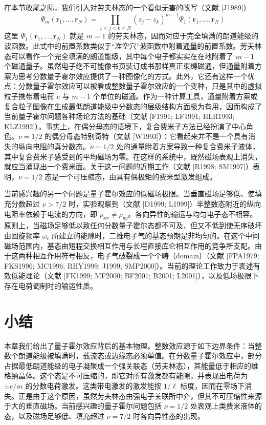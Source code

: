 在本节收尾之际，我们引入对劳夫林态的一个看似无害的改写（文献 [J1989]）
\begin{equation*}
\Psi_{m}(\mathbf{r}_{1},\ldots,\mathbf{r}_{N})=\prod_{1\le j<k\le N}(z_{j}-z_{k})^{m-1}\Psi_{1}(\mathbf{r}_{1},\ldots,\mathbf{r}_{N})\tag{15.95}
\end{equation*}
这里 $\Psi_{1}(\mathbf{r}_{1},\ldots,\mathbf{r}_{N})$ 就是 $m=1$ 的劳夫林态，因而对应于完全填满的朗道能级的波函数。此式中的前置系数类似于“准空穴”波函数中附着通量的前置系数。劳夫林态可以看作一个完全填满的朗道能级，其中每个电子都实实在在地附着了 $m-1$ 个磁通量子。虽然电子绝不可能像书页装订成书那样真正束缚磁通，但通量附着方案为思考分数量子霍尔效应提供了一种图像化的方式。此外，它还有这样一个优点：分数量子霍尔效应可以被看成整数量子霍尔效应的一个变种，只是其中的虚拟粒子携带着电荷 $e$ 与 $m-1$ 个单位的磁通。作为一种计算工具，通量附着方案或复合粒子图像在生成最低朗道能级中分数态的层级结构方面极为有用，因而构成了当前量子霍尔问题各种场论方法的基础（文献 [F1991; LF1991; HLR1993; KLZ1992]）。事实上，在偶分母态的语境下，复合费米子方法已经扮演了中心角色。$\nu=1/2$ 的偶分母态特别奇特（文献 [W1993]）：它看起来并不是一个具有消失的纵向电阻的真分数态。$\nu=1/2$ 处的通量附着方案导致一种复合费米子液体，其中复合费米子感受到的平均磁场为零。在这样的系统中，既然磁场表观上消失，就应当涌现出一个费米面。关于这一问题的近期工作（文献 [R1998; SM1997]）表明，$\nu=1/2$ 态是一个可压缩态，由具有偶极矩的费米型激发组成。

当前感兴趣的另一个问题是量子霍尔效应的低磁场极限。当垂直磁场足够低、使填充分数超过 $\nu>7/2$ 时，实验观察到（文献 [D1999; L1999]）半整数态附近的纵向电阻率依赖于电流的方向，即 $\rho_{xx}\neq\rho_{yy}$。各向异性的输运与均匀电子态不相容。原则上，当磁场足够低以致任何分数量子霍尔态都不可及、但又不低到使无序破坏由回旋频率 $\omega_{\mathrm{c}}$ 所建立的能隙时，二维电子气的基态预期是非均匀的。在这个中间磁场范围内，基态由短程交换相互作用与长程直接库仑相互作用的竞争所支配。由于这两种相互作用符号相反，电子气破裂成一个个畴（domain）（文献 [FPA1979; FKS1996; MC1996; RHY1999; J1999; SMP2000]）。当前的理论工作致力于表述有效低能理论（文献 [FK1999; MF2000; BF2001; B2001; L2001]），以及低场极限下存在电荷调制时的输运性质。

\section*{小结}

本章我们给出了量子霍尔效应背后的基本物理。整数效应源于如下边界条件：当整数个朗道能级被填满时，载流态或边缘态必须单值。在分数量子霍尔效应中，部分占据最低朗道能级的电子凝聚成一个强关联态（劳夫林态），其能量低于相应的维格纳晶体。这个态是不可压缩的，即它对所有激发都有能隙，并表现出电荷为 $\pm e/m$ 的分数电荷激发。这类带电激发的激发能按 $1/\ell$ 标度，因而在零场下消失。正是由于这个原因，虽然劳夫林态由强电子关联所中介，但其不可压缩性来源于大的垂直磁场。当前感兴趣的量子霍尔问题包括 $\nu=1/2$ 处表观上类费米液体的态，以及磁场足够低、填充超过 $\nu=7/2$ 时各向异性态的出现。

